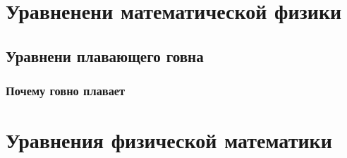 
\chapter{Уравненени математической физики}
\section{Уравнени плавающего говна}
\subsection{Почему говно плавает}

\chapter{Уравнения физической математики}